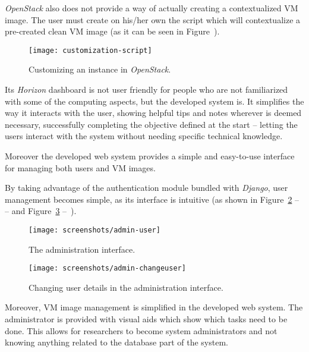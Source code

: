 \textit{OpenStack} also does not provide a way of actually creating a contextualized VM image. The user must create on his/her own the script which will contextualize a pre-created clean VM image (as it can be seen in Figure~). 

\begin{figure}[h]
  \begin{center}
    \leavevmode
    \texttt{[image: customization-script]}
    \caption{Customizing an instance in \textit{OpenStack}.}
    \label{fig:customization-script}
  \end{center}
\end{figure}


Its \textit{Horizon} dashboard is not user friendly for people who are not familiarized with some of the computing aspects, but the developed system is. It simplifies the way it interacts with the user, showing helpful tips and notes wherever is deemed necessary, successfully completing the objective defined at the start -- letting the users interact with the system without needing specific technical knowledge.

Moreover the developed web system provides a simple and easy-to-use interface for managing both users and VM images.

By taking advantage of the authentication module bundled with \textit{Django}, user management becomes simple, as its interface is intuitive (as shown in Figure~\ref{fig:admin-user} --~ -- and Figure~\ref{fig:admin-changeuser} --~).

\begin{figure}[h]
  \begin{center}
    \leavevmode
    \texttt{[image: screenshots/admin-user]}
    \caption{The administration interface.}
    \label{fig:admin-user}
  \end{center}
\end{figure}

\begin{figure}[h]
  \begin{center}
    \leavevmode
    \texttt{[image: screenshots/admin-changeuser]}
    \caption{Changing user details in the administration interface.}
    \label{fig:admin-changeuser}
  \end{center}
\end{figure}

Moreover, VM image management is simplified in the developed web system. The administrator is provided with visual aids which show which tasks need to be done. This allows for researchers to become system administrators and not knowing anything related to the database part of the system. 

